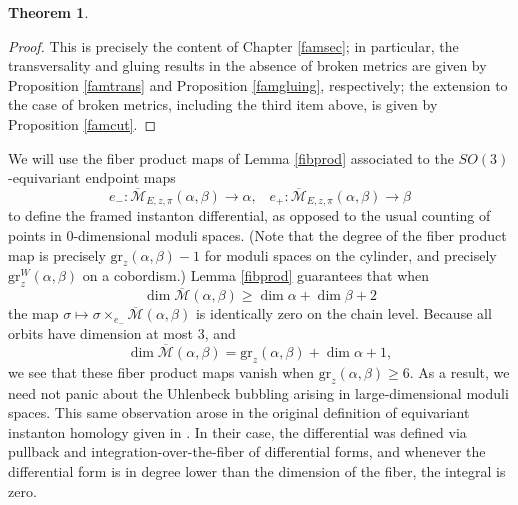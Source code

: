 \documentclass{memo-l}
\newtheorem{theorem}{Theorem}[chapter]
\theoremstyle{definition}
\theoremstyle{remark}
\numberwithin{section}{chapter}
\numberwithin{equation}{chapter}
\begin{document}
\begin{theorem}
\begin{enumerate}
\end{enumerate}
\end{theorem}

\begin{proof}
This is precisely the content of Chapter \ref{famsec}; in particular, the transversality and gluing results in the absence of broken metrics are given by Proposition \ref{famtrans} and Proposition \ref{famgluing}, respectively; the extension to the case of broken metrics, including the third item above, is given by Proposition \ref{famcut}.
\end{proof}

We will use the fiber product maps of Lemma \ref{fibprod} associated to the $SO(3)$-equivariant endpoint maps $$e_-: \overline{\mathcal M}_{E,z,\pi}(\alpha, \beta) \to \alpha, \;\;\; e_+: \overline{\mathcal M}_{E,z,\pi}(\alpha, \beta) \to \beta$$ to define the framed instanton differential, as opposed to the usual counting of points in 0-dimensional moduli spaces. (Note that the degree of the fiber product map is precisely $\text{gr}_z(\alpha, \beta) - 1$ for moduli spaces on the cylinder, and precisely $\text{gr}_z^W(\alpha, \beta)$ on a cobordism.) Lemma \ref{fibprod} guarantees that when
$$\dim \overline{\mathcal M}(\alpha, \beta) \geq \dim \alpha + \dim \beta + 2$$
the map $\sigma \mapsto \sigma \times_{e_-} \overline{\mathcal M}(\alpha, \beta)$ is identically zero on the chain level. Because all orbits have dimension at most $3$, and
$$\dim \overline{\mathcal M}(\alpha, \beta) = \text{gr}_z(\alpha, \beta) + \dim \alpha+1,$$
we see that these fiber product maps vanish when $\text{gr}_z(\alpha, \beta) \geq 6$. As a result, we need not panic about the Uhlenbeck bubbling arising in large-dimensional moduli spaces. This same observation arose in the original definition of equivariant instanton homology given in \cite{AB}. In their case, the differential was defined via pullback and integration-over-the-fiber of differential forms, and whenever the differential form is in degree lower than the dimension of the fiber, the integral is zero.
\end{document}
